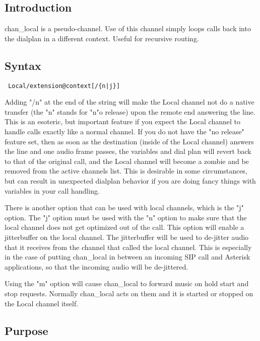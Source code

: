 \subsection{Introduction}

chan\_local is a pseudo-channel. Use of this channel simply loops calls back
into the dialplan in a different context. Useful for recursive routing.

\subsection{Syntax}
\begin{verbatim}
 Local/extension@context[/{n|j}]
\end{verbatim}

Adding "/n" at the end of the string will make the Local channel not do a
native transfer (the "n" stands for "n"o release) upon the remote end answering
the line. This is an esoteric, but important feature if you expect the Local
channel to handle calls exactly like a normal channel. If you do not have the
"no release" feature set, then as soon as the destination (inside of the Local
channel) answers the line and one audio frame passes, the variables and dial plan
will revert back to that of the original call, and the Local channel will become a
zombie and be removed from the active channels list. This is desirable in some
circumstances, but can result in unexpected dialplan behavior if you are doing
fancy things with variables in your call handling.

There is another option that can be used with local channels, which is the "j"
option.  The "j" option must be used with the "n" option to make sure that the
local channel does not get optimized out of the call.  This option will enable
a jitterbuffer on the local channel.  The jitterbuffer will be used to de-jitter
audio that it receives from the channel that called the local channel.  This is
especially in the case of putting chan\_local in between an incoming SIP call
and Asterisk applications, so that the incoming audio will be de-jittered.

Using the "m" option will cause chan_local to forward music on hold start and stop
requests. Normally chan_local acts on them and it is started or stopped on the
Local channel itself.

\subsection{Purpose}

